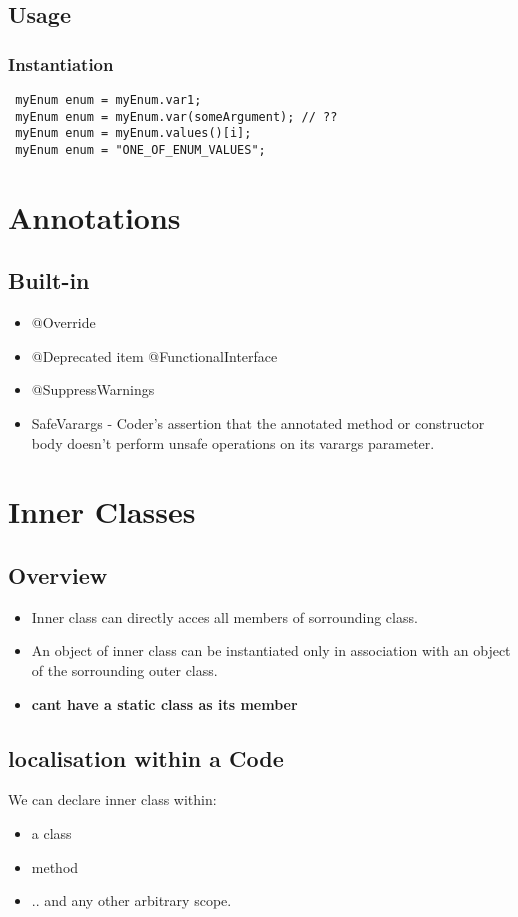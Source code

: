 \documentclass{report}
\begin{document}
 
 \section{Usage}
 \subsection{Instantiation}
 \begin{verbatim}
 myEnum enum = myEnum.var1;
 myEnum enum = myEnum.var(someArgument); // ??
 myEnum enum = myEnum.values()[i];
 myEnum enum = "ONE_OF_ENUM_VALUES";
 \end{verbatim}
 
 
 
\chapter{Annotations}
\section{Built-in}
\begin{itemize}
	\item @Override
	\item @Deprecated
	item @FunctionalInterface
	\item @SuppressWarnings
	\item SafeVarargs - Coder’s assertion that the annotated method or constructor body doesn’t perform unsafe operations on its varargs parameter.
\end{itemize}

\chapter{Inner Classes}
\section{Overview}
\begin{itemize}
	\item Inner class can directly acces all members of sorrounding class. 
	\item An object of inner class can  be instantiated only in association with an object
	of the sorrounding outer class.
	\item \textbf{cant have a static class as its member}
\end{itemize}

\section{localisation within a Code}
We can declare inner class within:
\begin{itemize}
	\item a class
	\item method
	\item .. and any other arbitrary scope.
\end{itemize}
\end{document}
